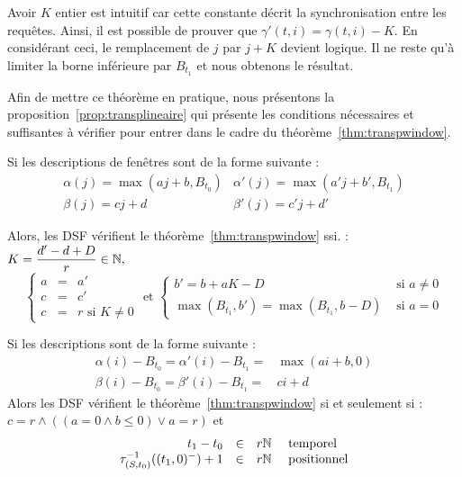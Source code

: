 Avoir $K$ entier est intuitif car cette constante décrit la synchronisation entre les requêtes. Ainsi, il est possible de prouver que $\gamma'(t,i) = \gamma(t,i) - K$. En considérant ceci, le remplacement de $j$ par $j+K$ devient logique. Il ne reste qu'à limiter la borne inférieure par $B_{t_1}$ et nous obtenons le résultat.

Afin de mettre ce théorème en pratique, nous présentons la proposition~\ref{prop:transplineaire} qui présente les conditions nécessaires et suffisantes à vérifier pour entrer dans le cadre du théorème~\ref{thm:transpwindow}.
\begin{prop}\label{prop:transplineaire}
    Si les descriptions de fenêtres sont de la forme suivante :
$$\begin{array}{ll} \alpha(j) = \max(aj+b,B_{t_0}) & \alpha'(j) = \max(a'j+b',B_{t_1})\\ \beta(j) = cj+d & \beta'(j) = c'j+d' \end{array}$$

    Alors, les DSF vérifient le théorème~\ref{thm:transpwindow} ssi. :  $K=\dfrac{d'-d+D}r \in \mathbb{N},$
$$\left\{\begin{array}{rcl} a & = & a'\\ c & = & c'\\ c & = & r \textrm{\ si\ } K \neq 0 \end{array}\right.\textrm{ et }\begin{cases} b' = b+aK-D & \textrm{\ si\ } a \neq 0\\ \max(B_{t_1},b') = \max(B_{t_1}, b-D)& \textrm{\ si\ } a=0 \end{cases}$$
\end{prop}
\begin{coro}\label{coro:transplineaire}
    Si les descriptions sont de la forme suivante :
$$\begin{array}{ll} \alpha(i) - B_{t_0} = \alpha'(i)-B_{t_1} = & \max(ai+b,0)\\ \beta(i) - B_{t_0} = \beta'(i)-B_{t_1} = & ci+d \end{array}$$
    Alors les DSF vérifient le théorème~\ref{thm:transpwindow} si et seulement si : $c = r \wedge ((a = 0 \wedge b\leq 0) \vee a = r)$ et
$$\begin{array}{rcl} t_1 - t_0 & \in & r\mathbb{N} \quad \textrm{\ temporel}\\ \tau_{(S,t_0)}^{-1} ((t_1,0)^-)+1 & \in & r\mathbb{N} \quad \textrm{\ positionnel} \end{array}$$
\end{coro}


